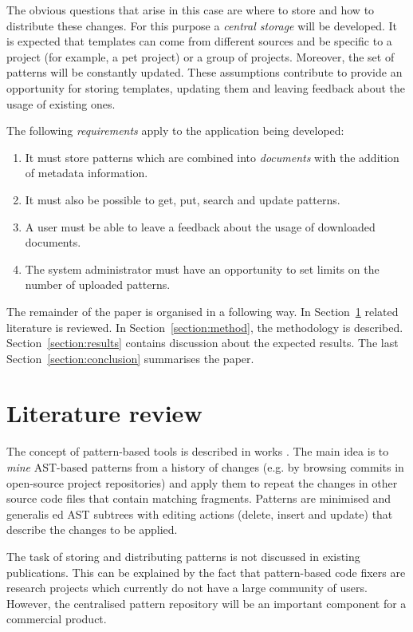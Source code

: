 \documentclass[letterpaper, 10 pt, conference]{ieeeconf}  %
\begin{document}
The obvious questions that arise in this case are where to store and
how to distribute these changes. 
For this purpose a \emph{central storage} will be developed. 
It is expected that templates can come from different sources and be specific
to a project (for example, a pet project) or a group of projects. 
Moreover, the set of patterns will be constantly updated. 
These assumptions contribute to provide an opportunity for storing templates,
updating them and leaving feedback about the usage of existing ones.

The following \emph{requirements} apply to the application being developed:
\begin{enumerate}
    \item It must store patterns which are combined into \emph{documents}
    with the addition of metadata information.
    \item It must also be possible to get, put, search and
    update patterns.
    \item A user must be able to leave a feedback about the usage of
    downloaded documents.
    \item The system administrator must have an opportunity to set limits on
    the number of uploaded patterns.
\end{enumerate}

The remainder of the paper is organised in a following way. 
In Section~\ref{section:review} related literature is reviewed. 
In Section~\ref{section:method}, the methodology is described. 
Section~\ref{section:results} contains discussion about the expected results.
The last Section~\ref{section:conclusion} summarises the paper.

\section{Literature review}
\label{section:review}

The concept of pattern-based tools is described in works \cite{c1, c2, c3}.
The main idea is to \emph{mine} AST-based patterns from a history of 
changes (e.g. by browsing commits in open-source project repositories) and 
apply them to repeat the changes in other source code files that contain
matching fragments. 
Patterns are minimised and generalis    ed AST subtrees with editing actions
(delete, insert and update) \cite{c9} that describe the changes to be applied.

The task of storing and distributing patterns is not discussed in existing
publications. 
This can be explained by the fact that pattern-based code fixers are research
projects which currently do not have a large community of users. 
However, the centralised pattern repository will be an important component
for a commercial product.
\end{document}

